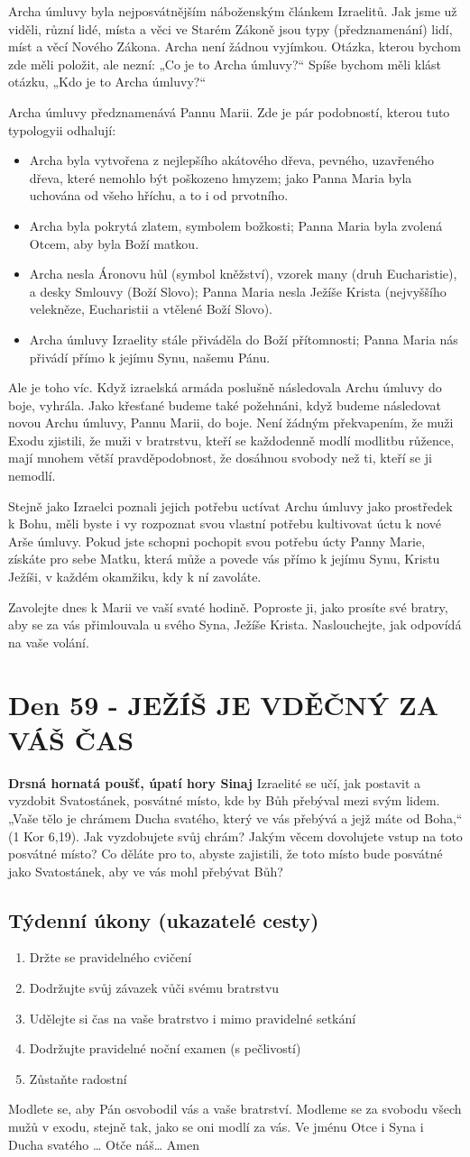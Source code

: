 \documentclass[11pt]{article}
\newcommand{\zacatekDevatyTyden}{
\textbf{Drsná hornatá poušť, úpatí hory Sinaj} \newline 
Izraelité se učí, jak postavit a vyzdobit Svatostánek, posvátné místo, kde by Bůh přebýval mezi svým lidem. „Vaše tělo je chrámem Ducha svatého, který ve vás přebývá a jejž máte od Boha,“ (1 Kor 6,19). Jak vyzdobujete svůj chrám? Jakým věcem dovolujete vstup na toto posvátné místo? Co děláte pro to, abyste zajistili, že toto místo bude posvátné jako Svatostánek, aby ve vás mohl přebývat Bůh?

\subsection*{Týdenní úkony (ukazatelé cesty)}
\begin{enumerate}
  \item Držte se pravidelného cvičení
  \item Dodržujte svůj závazek vůči svému bratrstvu
  \item Udělejte si čas na vaše bratrstvo i mimo pravidelné setkání
  \item Dodržujte pravidelné noční examen (s pečlivostí)
  \item Zůstaňte radostní
\end{enumerate}
Modlete se, aby Pán osvobodil vás a vaše bratrství. \newline
Modleme se za svobodu všech mužů v exodu, stejně tak, jako se oni modlí za vás.\newline
Ve jménu Otce i Syna i Ducha svatého …  Otče náš… Amen
}
\begin{document}
Archa úmluvy byla nejposvátnějším náboženským článkem Izraelitů. Jak jsme už viděli, různí lidé, místa a věci ve
Starém Zákoně jsou typy (předznamenání) lidí, míst a věcí Nového Zákona. Archa není žádnou vyjímkou. Otázka,
kterou bychom zde měli položit, ale nezní: „Co je to Archa úmluvy?“ Spíše bychom měli klást otázku, „Kdo je to
Archa úmluvy?“

Archa úmluvy předznamenává Pannu Marii. Zde je pár podobností, kterou tuto typologyii odhalují:
\begin{itemize}
  \item Archa byla vytvořena z nejlepšího akátového dřeva, pevného, uzavřeného dřeva, které nemohlo být poškozeno hmyzem; jako Panna Maria byla uchována od všeho hříchu, a to i od prvotního.
  \item Archa byla pokrytá zlatem, symbolem božkosti; Panna Maria byla zvolená Otcem, aby byla Boží matkou.
  \item Archa nesla Áronovu hůl (symbol kněžství), vzorek many (druh Eucharistie), a desky Smlouvy (Boží Slovo); Panna Maria nesla Ježíše Krista (nejvyššího velekněze, Eucharistii a vtělené Boží Slovo).
  \item Archa úmluvy Izraelity stále přiváděla do Boží přítomnosti; Panna Maria nás přivádí přímo k jejímu Synu, našemu Pánu.
\end{itemize}

Ale je toho víc. Když izraelská armáda poslušně následovala Archu úmluvy do boje, vyhrála. Jako křesťané budeme
také požehnáni, když budeme následovat novou Archu úmluvy, Pannu Marii, do boje. Není žádným překvapením, že
muži Exodu zjistili, že muži v bratrstvu, kteří se každodenně modlí modlitbu růžence, mají mnohem větší
pravděpodobnost, že dosáhnou svobody než ti, kteří se ji nemodlí.

Stejně jako Izraelci poznali jejich potřebu uctívat Archu úmluvy jako prostředek k Bohu, měli byste i vy rozpoznat
svou vlastní potřebu kultivovat úctu k nové Arše úmluvy. Pokud jste schopni pochopit svou potřebu úcty Panny Marie,
získáte pro sebe Matku, která může a povede vás přímo k jejímu Synu, Kristu Ježíši, v každém okamžiku, kdy k ní
zavoláte.

Zavolejte dnes k Marii ve vaší svaté hodině. Poproste ji, jako prosíte své bratry, aby se za vás přimlouvala u svého
Syna, Ježíše Krista. Naslouchejte, jak odpovídá na vaše volání.


\newpage
\section{Den 59 - JEŽÍŠ JE VDĚČNÝ ZA VÁŠ ČAS}
\zacatekDevatyTyden
\end{document}
